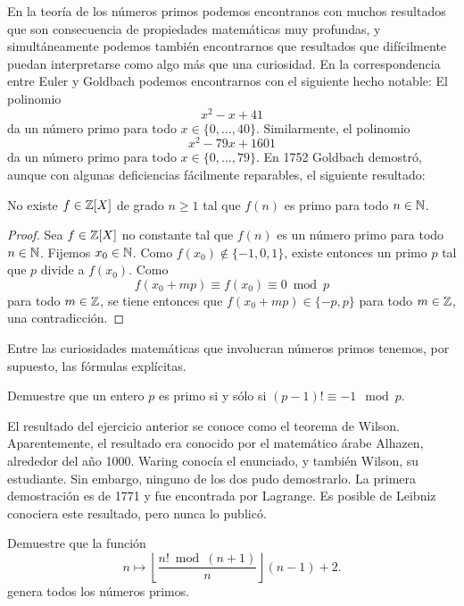En la teoría de los números primos podemos encontranos con muchos resultados
que son consecuencia de propiedades matemáticas muy profundas, y
simultáneamente podemos también encontrarnos que resultados que difícilmente
puedan interpretarse como algo más que una curiosidad.  En la correspondencia
entre Euler y Goldbach podemos encontrarnos con el siguiente hecho notable: El
polinomio 
\[
	x^2-x+41
\]
da un número primo para todo $x\in\{0,\dots,40\}$. Similarmente, el polinomio
\[
	x^2-79x+1601
\]
da un número primo para todo $x\in\{0,\dots,79\}$. En 1752 Goldbach demostró,
aunque con algunas deficiencias fácilmente reparables, el siguiente resultado:

\begin{theorem}[Goldbach]
	No existe $f\in\mathbb{Z}[X]$ de grado $n\geq1$ tal que $f(n)$ es primo para todo
	$n\in\mathbb{N}$.
\end{theorem}

\begin{proof}
	Sea $f\in\mathbb{Z}[X]$ no constante tal que $f(n)$ es un número primo para todo
	$n\in\mathbb{N}$. Fijemos $x_0\in\mathbb{N}$. Como $f(x_0)\not\in\{-1,0,1\}$, existe
	entonces un primo $p$ tal que $p$ divide a $f(x_0)$. Como
	\[
		f(x_0+mp)\equiv f(x_0)\equiv 0\bmod p
	\]
	para todo $m\in\mathbb{Z}$, se tiene entonces que $f(x_0+mp)\in\{-p,p\}$ para todo
	$m\in\mathbb{Z}$, una contradicción.
\end{proof}

Entre las curiosidades matemáticas que involucran números primos tenemos, por
supuesto, las fórmulas explícitas. 

\begin{exercise}
	Demuestre que un entero $p$ es primo si y sólo si
	$(p-1)!\equiv -1\mod p$. 
\end{exercise}

El resultado del ejercicio anterior se conoce como el teorema de Wilson.
Aparentemente, el resultado era conocido por el matemático árabe Alhazen,
alrededor del año 1000. Waring conocía el enunciado, y también Wilson, su
estudiante. Sin embargo, ninguno de los dos pudo demostrarlo. La primera
demostración es de 1771 y fue encontrada por Lagrange. Es posible de Leibniz
conociera este resultado, pero nunca lo publicó.



\begin{exercise}
	Demuestre que la función 
	\[
		n\mapsto \left\lfloor\frac{n!\bmod (n+1)}{n}\right\rfloor (n-1)+2.
	\]
	genera todos los números primos. 
\end{exercise}

